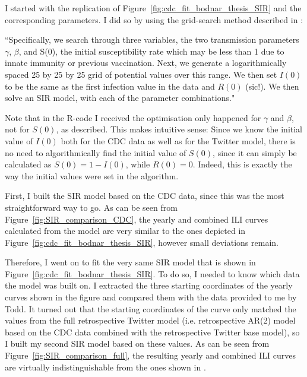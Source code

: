 \documentclass[11pt, a4paper,twoside]{report}\usepackage[]{graphicx}\usepackage[]{color}
\begin{document}
I started with the replication of Figure~\ref{fig:cdc_fit_bodnar_thesis_SIR} and the corresponding parameters. I did so by using the grid-search method described in \cite{bodnar_data_2015}: 

``Specifically, we search through three variables, the two transmission parameters $\gamma$, $\beta$, and S(0), the initial susceptibility rate which may be less than 1 due to innate immunity or previous vaccination. Next, we generate a logarithmically spaced 25 by 25 by 25 grid of potential values over this range. We then set $I(0)$ to be the same as the first infection value in the data and $R(0)$ (sic!). We then solve an SIR model, with each of the parameter combinations." 

Note that in the R-code I received the optimisation only happened for $\gamma$ and $\beta$, not for $S(0)$, as described. This makes intuitive sense: Since we know the initial value of $I(0)$ both for the CDC data as well as for the Twitter model, there is no need to algorithmically find the initial value of $S(0)$, since it can simply be calculated as $S(0)=1-I(0)$, while $R(0)=0$. Indeed, this is exactly the way the initial values were set in the algorithm.

First, I built the SIR model based on the CDC data, since this was the most straightforward way to go. As can be seen from Figure~\ref{fig:SIR_comparison_CDC}, the yearly and combined ILI curves calculated from the model are very similar to the ones depicted in Figure~\ref{fig:cdc_fit_bodnar_thesis_SIR}, however small deviations remain.

Therefore, I went on to fit the very same SIR model that is shown in Figure~\ref{fig:cdc_fit_bodnar_thesis_SIR}. To do so, I needed to know which data the model was built on. I extracted the three starting coordinates of the yearly curves shown in the figure and compared them with the data provided to me by Todd. It turned out that the starting coordinates of the curve only matched the values from the full retrospective Twitter model (i.e. retrospective AR(2) model based on the CDC data combined with the retrospective Twitter base model), so I built my second SIR model based on these values. As can be seen from Figure~\ref{fig:SIR_comparison_full}, the resulting yearly and combined ILI curves are virtually indistinguishable from the ones shown in \cite{bodnar_data_2015}.
\end{document}
